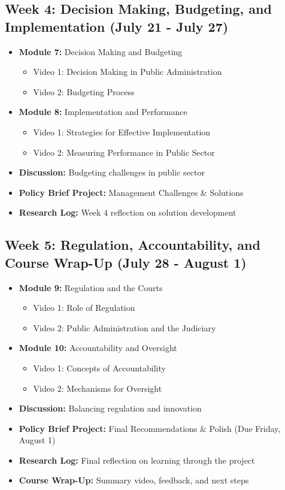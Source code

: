 \documentclass[11pt, letterpaper]{article}
\begin{document}
\subsection*{Week 4: Decision Making, Budgeting, and Implementation (July 21 - July 27)}

\begin{itemize}
    \item \textbf{Module 7:} Decision Making and Budgeting
        \begin{itemize}
            \item Video 1: Decision Making in Public Administration
            \item Video 2: Budgeting Process
        \end{itemize}
    \item \textbf{Module 8:} Implementation and Performance
        \begin{itemize}
            \item Video 1: Strategies for Effective Implementation
            \item Video 2: Measuring Performance in Public Sector
        \end{itemize}
    \item \textbf{Discussion:} Budgeting challenges in public sector
    \item \textbf{Policy Brief Project:} Management Challenges \& Solutions
    \item \textbf{Research Log:} Week 4 reflection on solution development
\end{itemize}

\subsection*{Week 5: Regulation, Accountability, and Course Wrap-Up (July 28 - August 1)}

\begin{itemize}
    \item \textbf{Module 9:} Regulation and the Courts
        \begin{itemize}
            \item Video 1: Role of Regulation
            \item Video 2: Public Administration and the Judiciary
        \end{itemize}
    \item \textbf{Module 10:} Accountability and Oversight
        \begin{itemize}
            \item Video 1: Concepts of Accountability
            \item Video 2: Mechanisms for Oversight
        \end{itemize}
    \item \textbf{Discussion:} Balancing regulation and innovation
    \item \textbf{Policy Brief Project:} Final Recommendations \& Polish (Due Friday, August 1)
    \item \textbf{Research Log:} Final reflection on learning through the project
    \item \textbf{Course Wrap-Up:} Summary video, feedback, and next steps
\end{itemize}
\end{document}
